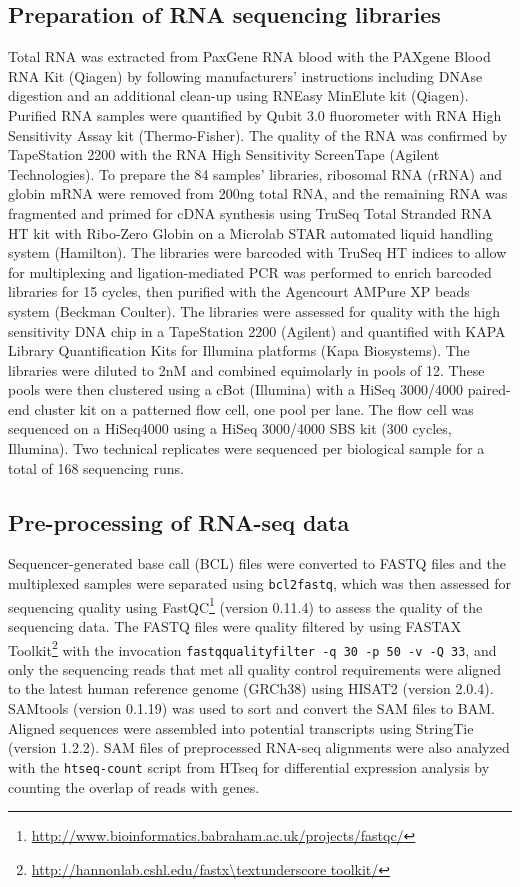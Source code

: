 \subsection{Preparation of RNA sequencing libraries}

Total RNA was extracted from PaxGene RNA blood with the PAXgene Blood RNA Kit (Qiagen) by following manufacturers’ instructions including DNAse digestion and an additional clean-up using RNEasy MinElute kit (Qiagen). Purified RNA samples were quantified by Qubit 3.0 fluorometer with RNA High Sensitivity Assay kit (Thermo-Fisher). The quality of the RNA was confirmed by TapeStation 2200 with the RNA High Sensitivity ScreenTape (Agilent Technologies). To prepare the 84 samples’ libraries, ribosomal RNA (rRNA) and globin mRNA were removed from 200ng total RNA, and the remaining RNA was fragmented and primed for cDNA synthesis using TruSeq Total Stranded RNA HT kit with Ribo-Zero Globin on a Microlab STAR automated liquid handling system (Hamilton). The libraries were barcoded with TruSeq HT indices to allow for multiplexing and ligation-mediated PCR was performed to enrich barcoded libraries for 15 cycles, then purified with the Agencourt AMPure XP beads system (Beckman Coulter). The libraries were assessed for quality with the high sensitivity DNA chip in a TapeStation 2200 (Agilent) and quantified with KAPA Library Quantification Kits for Illumina platforms (Kapa Biosystems). The libraries were diluted to 2nM and combined equimolarly in pools of 12. These pools were then clustered using a cBot (Illumina) with a HiSeq 3000/4000 paired-end cluster kit on a patterned flow cell, one pool per lane. The flow cell was sequenced on a HiSeq4000 using a HiSeq 3000/4000 SBS kit (300 cycles, Illumina). Two technical replicates were sequenced per biological sample for a total of 168 sequencing runs.

\subsection{Pre-processing of RNA-seq data}

Sequencer-generated base call (BCL) files were converted to FASTQ files and the multiplexed samples were separated using \texttt{bcl2fastq}, which was then assessed for sequencing quality using FastQC\footnote{\url{http://www.bioinformatics.babraham.ac.uk/projects/fastqc/}} (version 0.11.4) to assess the quality of the sequencing data. The FASTQ files were quality filtered by using FASTAX Toolkit\footnote{\url{http://hannonlab.cshl.edu/fastx\textunderscore toolkit/}} with the invocation \texttt{fastq\textunderscore quality\textunderscore filter -q 30 -p 50 -v -Q 33}, and only the sequencing reads that met all quality control requirements were aligned to the latest human reference genome (GRCh38) using HISAT2\autocite{Kim2015} (version 2.0.4). SAMtools\autocite{Li2009b} (version 0.1.19) was used to sort and convert the SAM files to BAM. Aligned sequences were assembled into potential transcripts using StringTie\autocite{Pertea2015} (version 1.2.2). SAM files of preprocessed RNA-seq alignments were also analyzed with the \texttt{htseq-count} script from HTseq\autocite{Anders2015} for differential expression analysis by counting the overlap of reads with genes.

